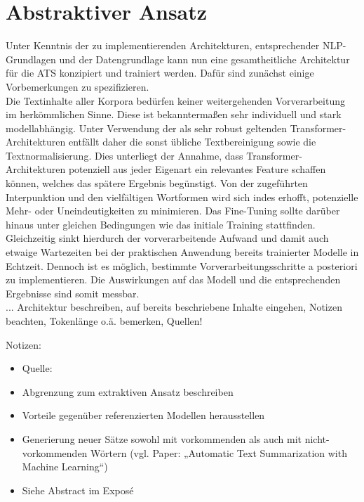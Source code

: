 \chapter{Abstraktiver Ansatz}
\thispagestyle{fancy}
\label{chap:Abstraktiver Ansatz}

Unter Kenntnis der zu implementierenden Architekturen, entsprechender \ac{NLP}-Grundlagen und der Datengrundlage kann nun eine gesamtheitliche Architektur für die \ac{ATS} konzipiert und trainiert werden. Dafür sind zunächst einige Vorbemerkungen zu spezifizieren.\\

Die Textinhalte aller Korpora bedürfen keiner weitergehenden Vorverarbeitung im herkömmlichen Sinne. Diese ist bekanntermaßen sehr individuell und stark modellabhängig. Unter Verwendung der als sehr robust geltenden Transformer-Architekturen entfällt daher die sonst übliche Textbereinigung sowie die Textnormalisierung. Dies unterliegt der Annahme, dass Transformer-Architekturen potenziell aus jeder Eigenart ein relevantes Feature schaffen können, welches das spätere Ergebnis begünstigt. Von der zugeführten Interpunktion und den vielfältigen Wortformen wird sich indes erhofft, potenzielle Mehr- oder Uneindeutigkeiten zu minimieren. Das Fine-Tuning sollte darüber hinaus unter gleichen Bedingungen wie das initiale Training stattfinden. Gleichzeitig sinkt hierdurch der vorverarbeitende Aufwand und damit auch etwaige Wartezeiten bei der praktischen Anwendung bereits trainierter Modelle in Echtzeit. Dennoch ist es möglich, bestimmte Vorverarbeitungsschritte a posteriori zu implementieren. Die Auswirkungen auf das Modell und die entsprechenden Ergebnisse sind somit messbar.\\

... Architektur beschreiben, auf bereits beschriebene Inhalte eingehen, Notizen beachten, Tokenlänge o.ä. bemerken, Quellen!

Notizen:
\begin{itemize}
	\item Quelle: \cite{NIT19}
	\item Abgrenzung zum extraktiven Ansatz beschreiben
	\item Vorteile gegenüber referenzierten Modellen herausstellen
	\item Generierung neuer Sätze sowohl mit vorkommenden als auch mit nicht-vorkommenden Wörtern (vgl. Paper: „Automatic Text Summarization with Machine Learning“)
	\item Siehe Abstract im Exposé
\end{itemize}


